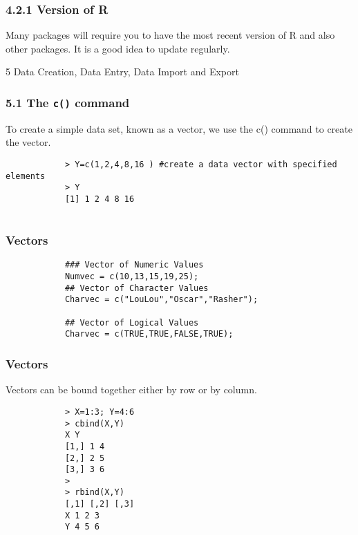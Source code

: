 \documentclass{beamer}
\begin{document}
 	\begin{frame}
 		\frametitle{4.2.1 Version of R}
 		Many packages will require you to have the most recent version of R and also other packages.
 		It is a good idea to update regularly.
 	\end{frame}
 	\begin{frame}
 		5 Data Creation, Data Entry, Data Import and Export
 	\end{frame}
 	\begin{frame}[fragile]
 		\frametitle{5.1 The \texttt{c()} command}
 		To create a simple data set, known as a vector, we use the c() command to create the vector.
 		\begin{framed}
 			\begin{verbatim}
 			> Y=c(1,2,4,8,16 ) #create a data vector with specified elements
 			> Y
 			[1] 1 2 4 8 16
 			
 			\end{verbatim}
 		\end{framed}
 		
 	\end{frame}
 	\begin{frame}[fragile]
 		\frametitle{Vectors}
 		\begin{framed}
 			\begin{verbatim}
 			### Vector of Numeric Values
 			Numvec = c(10,13,15,19,25);
 			## Vector of Character Values
 			Charvec = c("LouLou","Oscar","Rasher");
 			
 			## Vector of Logical Values
 			Charvec = c(TRUE,TRUE,FALSE,TRUE);
 			\end{verbatim}
 		\end{framed}
 	\end{frame}
 	\begin{frame}[fragile]
 		\frametitle{Vectors}	
 		Vectors can be bound together either by row or by column.
 		\begin{framed}
 			\begin{verbatim}
 			> X=1:3; Y=4:6
 			> cbind(X,Y)
 			X Y
 			[1,] 1 4
 			[2,] 2 5
 			[3,] 3 6
 			>
 			> rbind(X,Y)
 			[,1] [,2] [,3]
 			X 1 2 3
 			Y 4 5 6
 			\end{verbatim}
 		\end{framed}
 	\end{frame}
\end{document}
